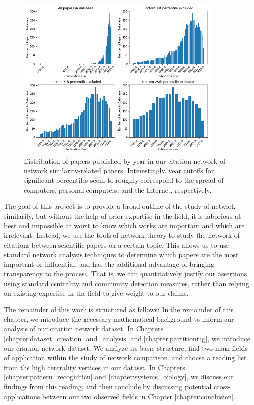 \documentclass[12pt]{thesis}
\theoremstyle{plain}
\theoremstyle{definition}
\theoremstyle{remark}
\begin{document}
\begin{figure}[h!]
\centering
\includegraphics[width=0.9\textwidth]{year_distribution.png}
\caption{Distribution of papers published by year in our citation network of network similarity-related papers. Interestingly, year cutoffs for significant percentiles seem to roughly correspond to the spread of computers, personal computers, and the Internet, respectively.}
\label{fig:year_distributions}
\end{figure}

The goal of this project is to provide a broad outline of the study of network similarity, but without the help of prior expertise in the field, it is laborious at best and impossible at worst to know which works are important and which are irrelevant. Instead, we use the tools of network theory to study the network of citations between scientific papers on a certain topic. This allows us to use standard network analysis techniques to determine which papers are the most important or influential, and has the additional advantage of bringing transparency to the process. That is, we can quantitatively justify our assertions using standard centrality and community detection measures, rather than relying on existing expertise in the field to give weight to our claims.

The remainder of this work is structured as follows: In the remainder of this chapter, we introduce the necessary mathematical background to inform our analysis of our citation network dataset. In Chapters \ref{chapter:dataset_creation_and_analysis} and \ref{chapter:partitioning}, we introduce our citation network dataset. We analyze its basic structure, find two main fields of application within the study of network comparison, and choose a reading list from the high centrality vertices in our dataset. In Chapters \ref{chapter:pattern_recognition} and \ref{chapter:systems_biology}, we discuss our findings from this reading, and then conclude by discussing potential cross-applications between our two observed fields in Chapter \ref{chapter:conclusion}.
\end{document}
